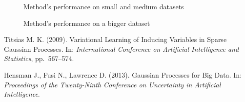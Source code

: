 \documentclass[12pt]{article}
\begin{document}
	\begin{figure}[!h]
		\centering
		\subfloat{
			\scalebox{0.75}{
				
			}
		}
		\subfloat{
			\scalebox{0.75}{
	    		
			}
		}

		\label{vi_small}
		\caption{Method's performance on small and medium datasets}
	\end{figure}
	\begin{figure}[!h]
		\centering
		\subfloat{
			\scalebox{0.75}{
				
			}
		}
		\label{vi_big}
		\caption{Method's performance on a bigger dataset}
	\end{figure}

\pagebreak
\begin{thebibliography}{99}

Titsias M. K. (2009).  Variational Learning of Inducing Variables in Sparse Gaussian
Processes.  In: {\it International Conference on Artificial Intelligence and Statistics}, pp.~567–574.

Hensman J., Fusi N., Lawrence D. (2013).  Gaussian Processes for Big Data.  In: {\it Proceedings of the Twenty-Ninth Conference on Uncertainty in Artificial Intelligence}.

\end{thebibliography}	
\end{document}
